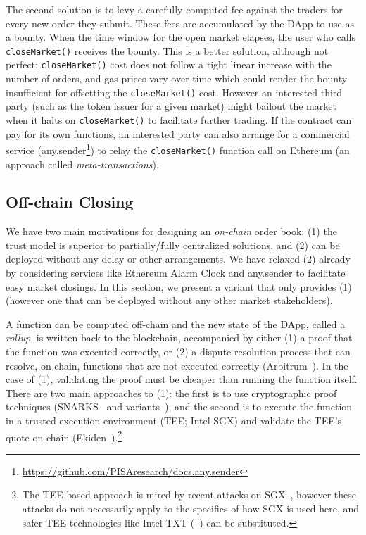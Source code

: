 The second solution is to levy a carefully computed fee against the traders for every new order they submit. These fees are accumulated by the DApp to use as a bounty. When the time window for the open market elapses, the user who calls \texttt{closeMarket()} receives the bounty. This is a better solution, although not perfect: \texttt{closeMarket()} cost does not follow a tight linear increase with the number of orders, and gas prices vary over time which could render the bounty insufficient for offsetting the \texttt{closeMarket()} cost. However an interested third party (such as the token issuer for a given market) might bailout the market when it halts on \texttt{closeMarket()} to facilitate further trading. If the contract can pay for its own functions, an interested party can also arrange for a commercial service (\eg any.sender\footnote{\url{https://github.com/PISAresearch/docs.any.sender}}) to relay the \texttt{closeMarket()} function call on Ethereum (an approach called \textit{meta-transactions}). 


\subsection{Off-chain Closing}
\label{sec:rollups}

We have two main motivations for designing an \textit{on-chain} order book: (1) the trust model is superior to partially/fully centralized solutions, and (2) \cm can be deployed without any delay or other arrangements. We have relaxed (2) already by considering services like Ethereum Alarm Clock and any.sender to facilitate easy market closings. In this section, we present a variant that only provides (1) (however one that can be deployed without any other market stakeholders). 

A function can be computed off-chain and the new state of the DApp, called a \textit{rollup}, is written back to the blockchain, accompanied by either (1) a proof that the function was executed correctly, or (2) a dispute resolution process that can resolve, on-chain, functions that are not executed correctly (\eg Arbitrum~\cite{kalodner2018arbitrum}). In the case of (1), validating the proof must be cheaper than running the function itself. There are two main approaches to (1): the first is to use cryptographic proof techniques (\eg SNARKS~\cite{BCGTV13,GGPR13} and variants~\cite{BBHR19}), and the second is to execute the function in a trusted execution environment (TEE; \eg Intel SGX) and validate the TEE's quote on-chain (\eg Ekiden~\cite{cheng2019ekiden}).\footnote{The TEE-based approach is mired by recent attacks on SGX~\cite{SGX1,SGX2,SGX3,SGX4}, however these attacks do not necessarily apply to the specifics of how SGX is used here, and safer TEE technologies like Intel TXT (\cf~\cite{ZBC+19}) can be substituted.}

